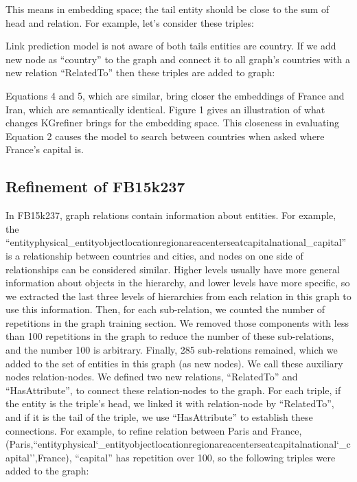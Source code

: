 \documentclass{article} \usepackage{iclr2022_conference,times}
\begin{document}
 This means in embedding space; the tail entity should be close to the sum of head and relation. For example, let's consider these triples: 
 
Link prediction model is not aware of both tails entities are country. If we add new node as ``country'' to the graph and connect it to all graph's countries with a new relation ``RelatedTo'' then these triples are added to graph: 

Equations 4 and 5, which are similar, bring closer the embeddings of France and Iran, which are semantically identical. Figure 1 gives an illustration of what changes KGrefiner brings for the embedding space. This closeness in evaluating Equation 2 causes the model to search between countries when asked where France’s capital is.
\subsection{Refinement of FB15k237}
In FB15k237, graph relations contain information about entities. For example, the ``entityphysical\_entityobjectlocationregionareacenterseatcapitalnational\_capital'' is a relationship between countries and cities, and nodes on one side of relationships can be considered similar. Higher levels usually have more general information about objects in the hierarchy, and lower levels have more specific, so we extracted the last three levels of hierarchies from each relation in this graph to use this information. Then, for each sub-relation, we counted the number of repetitions in the graph training section. We removed those components with less than 100 repetitions in the graph to reduce the number of these sub-relations, and the number 100 is arbitrary. Finally, 285 sub-relations remained, which we added to the set of entities in this graph (as new nodes). We call these auxiliary nodes relation-nodes. We defined two new relations, ``RelatedTo'' and ``HasAttribute'', to connect these relation-nodes to the graph. For each triple, if the entity is the triple's head, we linked it with relation-node by ``RelatedTo'', and if it is the tail of the triple, we use ``HasAttribute'' to establish these connections. For example, to refine relation between Paris and France, (Paris,``entityphysical\char`_entityobjectlocationregionareacenterseatcapitalnational\char`_capital'',France), ``capital'' has repetition over 100, so the following triples were added to the graph:
\end{document}

